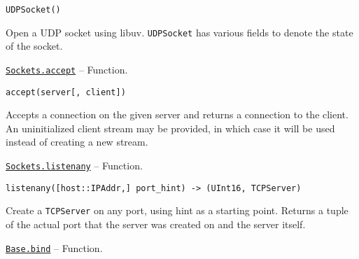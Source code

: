 \begin{adjustwidth}{2em}{0pt}


\begin{verbatim}
UDPSocket()
\end{verbatim}

Open a UDP socket using libuv. \texttt{UDPSocket} has various fields to denote the state of the socket.



\end{adjustwidth}
\hypertarget{1426793569216032849}{} 
\hyperlink{1426793569216032849}{\texttt{Sockets.accept}}  -- {Function.}

\begin{adjustwidth}{2em}{0pt}


\begin{verbatim}
accept(server[, client])
\end{verbatim}

Accepts a connection on the given server and returns a connection to the client. An uninitialized client stream may be provided, in which case it will be used instead of creating a new stream.



\end{adjustwidth}
\hypertarget{9909318444396548981}{} 
\hyperlink{9909318444396548981}{\texttt{Sockets.listenany}}  -- {Function.}

\begin{adjustwidth}{2em}{0pt}


\begin{verbatim}
listenany([host::IPAddr,] port_hint) -> (UInt16, TCPServer)
\end{verbatim}

Create a \texttt{TCPServer} on any port, using hint as a starting point. Returns a tuple of the actual port that the server was created on and the server itself.



\end{adjustwidth}
\hypertarget{13811388816704022260}{} 
\hyperlink{13811388816704022260}{\texttt{Base.bind}}  -- {Function.}

